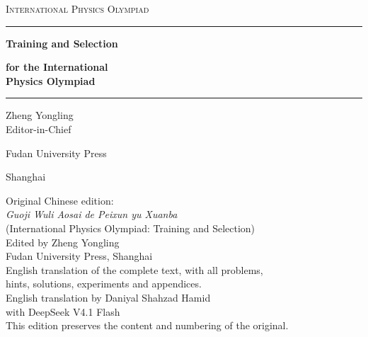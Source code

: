 \begin{titlepage}
\centering
\vspace*{1.2cm}
{\large\scshape International Physics Olympiad\par}
\vspace{2.2cm}
{\color{bookblue}\rule{\linewidth}{0.8pt}\par}
\vspace{1.0cm}
{\Huge\bfseries Training and Selection\par}
\vspace{0.5cm}
{\Huge\bfseries for the International\\[4pt] Physics Olympiad\par}
\vspace{1.0cm}
{\color{bookblue}\rule{\linewidth}{0.8pt}\par}
\vspace{2.0cm}
{\Large Zheng Yongling\\[3pt] \normalsize Editor-in-Chief\par}
\vfill
{\large Fudan University Press\par}
\vspace{0.4cm}
{\normalsize Shanghai\par}
\end{titlepage}

\thispagestyle{empty}
\vspace*{\fill}
\begin{center}
{\small
Original Chinese edition:\\
\textit{Guoji Wuli Aosai de Peixun yu Xuanba}\\
(International Physics Olympiad: Training and Selection)\\
Edited by Zheng Yongling\\
Fudan University Press, Shanghai\\[18pt]
English translation of the complete text, with all problems,\\
hints, solutions, experiments and appendices.\\[12pt]
English translation by Daniyal Shahzad Hamid\\
with DeepSeek V4.1 Flash\\[18pt]
This edition preserves the content and numbering of the original.
}
\end{center}
\vspace*{\fill}
\clearpage
